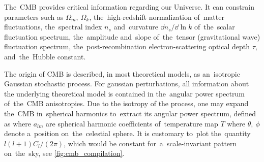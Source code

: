 The~CMB provides critical information regarding our Universe. It can constrain parameters such as $\Omega_m,\ \Omega_k$, the~high-redshift normalization of~matter fluctuations, the~spectral index $n_s$ and~curvature $\dd n_s/\dd \ln k$ of~the~scalar fluctuation spectrum, the~amplitude and~slope of~the~tensor (gravitational wave) fluctuation spectrum, the~post-recombination electron-scattering optical depth $\tau$, and~the~Hubble constant.

The origin of CMB is described, in most theoretical models, as an~isotropic Gaussian stochastic process. For gaussian perturbations, all information about the underlying theoretical model is contained in the~angular power spectrum of~the~CMB anisotropies. Due to the isotropy of the process, one may expand the~CMB in~spherical harmonics to~extract its angular power spectrum, defined as \parencite{2015IJMPD..2430004B}
where $a_{lm}$ are spherical harmonic coefficients of~temperature map $T$
where $\theta,\ \phi$  denote a~position on~the~celestial sphere. It is customary to~plot the~quantity $l(l+1)C_l/(2\pi)$, which would be constant for~a~scale-invariant pattern on~the~sky, see \autoref{fig:cmb_compilation}.

